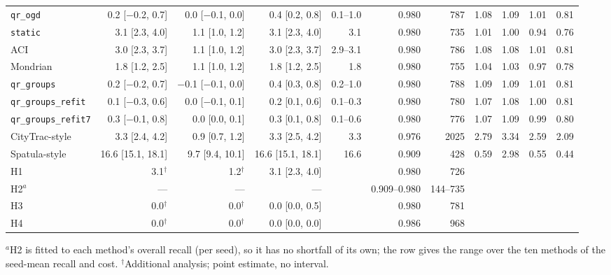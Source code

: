 \begin{tabular}{@{}lrrrrrrrrrr@{}}
\texttt{qr\_ogd} & 0.2 [$-$0.2, 0.7] & 0.0 [$-$0.1, 0.0] & 0.4 [0.2, 0.8] & 0.1--1.0 & 0.980 & 787 & 1.08 & 1.09 & 1.01 & 0.81 \\
\addlinespace
\texttt{static} & 3.1 [2.3, 4.0] & 1.1 [1.0, 1.2] & 3.1 [2.3, 4.0] & 3.1 & 0.980 & 735 & 1.01 & 1.00 & 0.94 & 0.76 \\
ACI & 3.0 [2.3, 3.7] & 1.1 [1.0, 1.2] & 3.0 [2.3, 3.7] & 2.9--3.1 & 0.980 & 786 & 1.08 & 1.08 & 1.01 & 0.81 \\
Mondrian & 1.8 [1.2, 2.5] & 1.1 [1.0, 1.2] & 1.8 [1.2, 2.5] & 1.8 & 0.980 & 755 & 1.04 & 1.03 & 0.97 & 0.78 \\
\texttt{qr\_groups} & 0.2 [$-$0.2, 0.7] & $-$0.1 [$-$0.1, 0.0] & 0.4 [0.3, 0.8] & 0.2--1.0 & 0.980 & 788 & 1.09 & 1.09 & 1.01 & 0.81 \\
\texttt{qr\_groups\_refit} & 0.1 [$-$0.3, 0.6] & 0.0 [$-$0.1, 0.1] & 0.2 [0.1, 0.6] & 0.1--0.3 & 0.980 & 780 & 1.07 & 1.08 & 1.00 & 0.81 \\
\texttt{qr\_groups\_refit7} & 0.3 [$-$0.1, 0.8] & 0.0 [0.0, 0.1] & 0.3 [0.1, 0.8] & 0.1--0.6 & 0.980 & 776 & 1.07 & 1.09 & 0.99 & 0.80 \\
CityTrac-style & 3.3 [2.4, 4.2] & 0.9 [0.7, 1.2] & 3.3 [2.5, 4.2] & 3.3 & 0.976 & 2025 & 2.79 & 3.34 & 2.59 & 2.09 \\
Spatula-style & 16.6 [15.1, 18.1] & 9.7 [9.4, 10.1] & 16.6 [15.1, 18.1] & 16.6 & 0.909 & 428 & 0.59 & 2.98 & 0.55 & 0.44 \\
\addlinespace
H1 & 3.1$^\dagger$ & 1.2$^\dagger$ & 3.1 [2.3, 4.0] & & 0.980 & 726 &  &  &  & \\
H2$^{a}$ & --- & --- & --- & & 0.909--0.980 & 144--735 &  &  &  & \\
H3 & 0.0$^\dagger$ & 0.0$^\dagger$ & 0.0 [0.0, 0.5] & & 0.980 & 781 &  &  &  & \\
H4 & 0.0$^\dagger$ & 0.0$^\dagger$ & 0.0 [0.0, 0.0] & & 0.986 & 968 &  &  &  & \\
\bottomrule
\end{tabular}

\smallskip\parbox{\textwidth}{\footnotesize $^{a}$H2 is fitted to each method's overall recall (per seed), so it has no shortfall of its own; the row gives the range over the ten methods of the seed-mean recall and cost. $^\dagger$Additional analysis; point estimate, no interval.}
